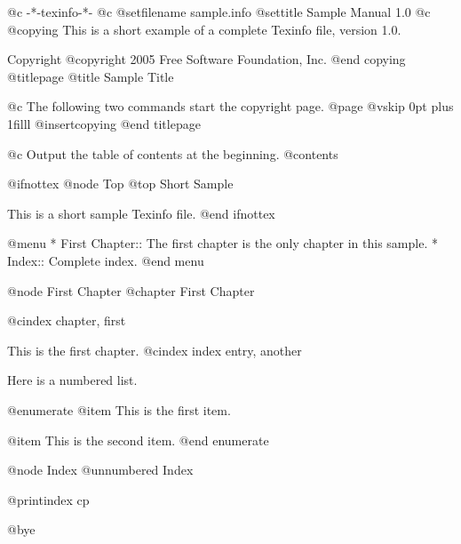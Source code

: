    @c -*-texinfo-*-
@c %
@setfilename sample.info
@settitle Sample Manual 1.0
@c %
@copying
This is a short example of a complete Texinfo file, version 1.0.

Copyright @copyright{} 2005 Free Software Foundation, Inc.
@end copying
@titlepage
@title Sample Title

@c The following two commands start the copyright page.
@page
@vskip 0pt plus 1filll
@insertcopying
@end titlepage

@c Output the table of contents at the beginning.
@contents

@ifnottex
@node Top
@top Short Sample

This is a short sample Texinfo file.
@end ifnottex

@menu
* First Chapter::    The first chapter is the
only chapter in this sample.
* Index::            Complete index.
@end menu

@node First Chapter
@chapter First Chapter

@cindex chapter, first

This is the first chapter.
@cindex index entry, another

Here is a numbered list.

@enumerate
@item
This is the first item.

@item
This is the second item.
@end enumerate

@node Index
@unnumbered Index

@printindex cp

@bye

